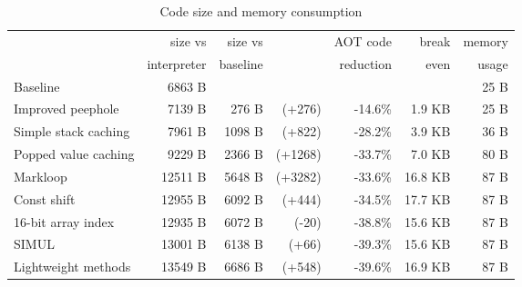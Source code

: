 
\begin{table}
\centering
\caption{Code size and memory consumption}
\label{tbl-code-size-and-memory-consumption}
    \begin{tabular}{lrrrrrr}
    \toprule
                              & size vs     & size vs  &                      & AOT code  &   break & memory    \\
                              & interpreter & baseline &                      & reduction &   even  & usage     \\
    \midrule
    \midrule
    Baseline                  &     6863 B  &          &                      &           &         & 25 B      \\
    Improved peephole         &     7139 B  &   276 B  & \scriptsize   (+276) &  -14.6\%  &  1.9 KB & 25 B      \\
    Simple stack caching      &     7961 B  &  1098 B  & \scriptsize   (+822) &  -28.2\%  &  3.9 KB & 36 B      \\
    Popped value caching      &     9229 B  &  2366 B  & \scriptsize  (+1268) &  -33.7\%  &  7.0 KB & 80 B      \\
    Markloop                  &    12511 B  &  5648 B  & \scriptsize  (+3282) &  -33.6\%  & 16.8 KB & 87 B      \\
    Const shift               &    12955 B  &  6092 B  & \scriptsize   (+444) &  -34.5\%  & 17.7 KB & 87 B      \\
    16-bit array index        &    12935 B  &  6072 B  & \scriptsize    (-20) &  -38.8\%  & 15.6 KB & 87 B      \\
    SIMUL                     &    13001 B  &  6138 B  & \scriptsize    (+66) &  -39.3\%  & 15.6 KB & 87 B      \\
    Lightweight methods       &    13549 B  &  6686 B  & \scriptsize   (+548) &  -39.6\%  & 16.9 KB & 87 B      \\
    \bottomrule
    \end{tabular}
\end{table}

